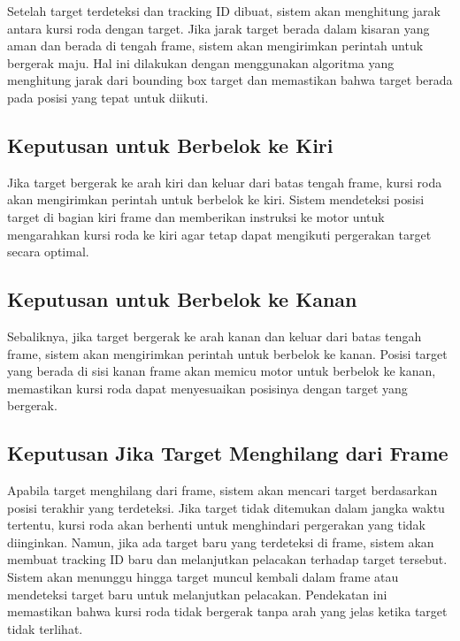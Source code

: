 Setelah target terdeteksi dan tracking ID dibuat, sistem akan menghitung jarak antara kursi roda dengan target. Jika jarak target berada dalam kisaran yang aman dan berada di tengah frame, sistem akan mengirimkan perintah untuk bergerak maju. Hal ini dilakukan dengan menggunakan algoritma yang menghitung jarak dari bounding box target dan memastikan bahwa target berada pada posisi yang tepat untuk diikuti.

\subsection{Keputusan untuk Berbelok ke Kiri}
\label{subsec:keputusan_belok_kiri}

Jika target bergerak ke arah kiri dan keluar dari batas tengah frame, kursi roda akan mengirimkan perintah untuk berbelok ke kiri. Sistem mendeteksi posisi target di bagian kiri frame dan memberikan instruksi ke motor untuk mengarahkan kursi roda ke kiri agar tetap dapat mengikuti pergerakan target secara optimal.

\subsection{Keputusan untuk Berbelok ke Kanan}
\label{subsec:keputusan_belok_kanan}

Sebaliknya, jika target bergerak ke arah kanan dan keluar dari batas tengah frame, sistem akan mengirimkan perintah untuk berbelok ke kanan. Posisi target yang berada di sisi kanan frame akan memicu motor untuk berbelok ke kanan, memastikan kursi roda dapat menyesuaikan posisinya dengan target yang bergerak.

\subsection{Keputusan Jika Target Menghilang dari Frame}
\label{subsec:keputusan_target_menghilang}

Apabila target menghilang dari frame, sistem akan mencari target berdasarkan posisi terakhir yang terdeteksi. Jika target tidak ditemukan dalam jangka waktu tertentu, kursi roda akan berhenti untuk menghindari pergerakan yang tidak diinginkan. Namun, jika ada target baru yang terdeteksi di frame, sistem akan membuat tracking ID baru dan melanjutkan pelacakan terhadap target tersebut. Sistem akan menunggu hingga target muncul kembali dalam frame atau mendeteksi target baru untuk melanjutkan pelacakan. Pendekatan ini memastikan bahwa kursi roda tidak bergerak tanpa arah yang jelas ketika target tidak terlihat.

